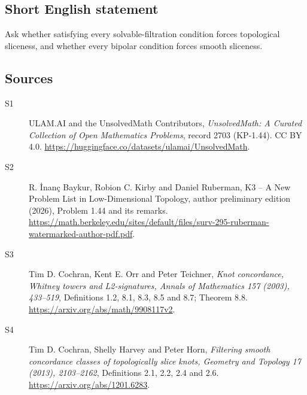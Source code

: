 \documentclass[11pt]{article}
\begin{document}
\subsection{Short English statement}
Ask whether satisfying every solvable-filtration condition forces topological sliceness, and whether every bipolar condition forces smooth sliceness.
\subsection{Sources}
\begin{description}
\item[\hypertarget{source:2703:1}{S1}] ULAM.AI and the UnsolvedMath Contributors, \emph{UnsolvedMath: A Curated Collection of Open Mathematics Problems}, record 2703 (KP-1.44). CC BY 4.0. \url{https://huggingface.co/datasets/ulamai/UnsolvedMath}.
\item[\hypertarget{source:2703:2}{S2}] R. \.{I}nan\c{c} Baykur, Robion C. Kirby and Daniel Ruberman, K3 -- A New Problem List in Low-Dimensional Topology, author preliminary edition (2026), Problem 1.44 and its remarks. \url{https://math.berkeley.edu/sites/default/files/surv-295-ruberman-watermarked-author-pdf.pdf}.
\item[\hypertarget{source:2703:3}{S3}] Tim D. Cochran, Kent E. Orr and Peter Teichner, \emph{Knot concordance, Whitney towers and L2-signatures, Annals of Mathematics 157 (2003), 433--519}, Definitions 1.2, 8.1, 8.3, 8.5 and 8.7; Theorem 8.8. \url{https://arxiv.org/abs/math/9908117v2}.
\item[\hypertarget{source:2703:4}{S4}] Tim D. Cochran, Shelly Harvey and Peter Horn, \emph{Filtering smooth concordance classes of topologically slice knots, Geometry and Topology 17 (2013), 2103--2162}, Definitions 2.1, 2.2, 2.4 and 2.6. \url{https://arxiv.org/abs/1201.6283}.
\end{description}
\label{end:2703}
\end{document}
